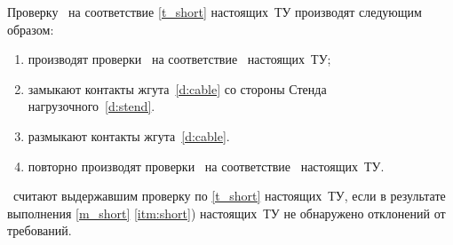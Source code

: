 Проверку \dut \ на соответствие \ref{t_short} настоящих~ТУ производят следующим образом:
%
\begin{enumerate}
	\item производят проверки \dut \ на соответствие \treb \ настоящих~ТУ;
	\item замыкают контакты жгута~\ref{d:cable} со стороны Стенда нагрузочного~\ref{d:stend}.
	\item размыкают контакты жгута~\ref{d:cable}.
	\item\label{itm:short} повторно производят проверки \dut \ на соответствие \treb \ настоящих~ТУ.
\end{enumerate}
 
\dut \ считают выдержавшим проверку по \ref{t_short} настоящих~ТУ, если в результате выполнения \ref{m_short} \ref{itm:short}) настоящих~ТУ не обнаружено отклонений от требований.